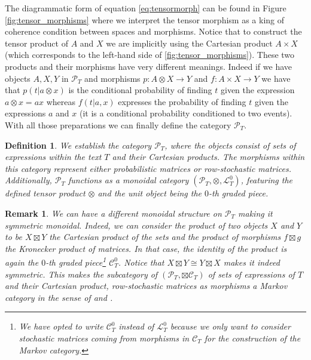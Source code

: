 \documentclass[10pt,a4paper]{elsarticle}
\newcommand{\C}{\mathcal{C}}
\renewcommand{\L}{\mathcal{L}}
\renewcommand{\P}{\mathcal{P}}
\newtheorem{definition}[theorem]{Definition}
\newtheorem{re}[theorem]{Remark}
\begin{document}
The diagrammatic form of equation \eqref{eq:tensormorph} can be found in Figure \ref{fig:tensor_morphisms} where we interpret the tensor morphism as a king of coherence condition between spaces and morphisms. Notice that to construct the tensor product of $A$ and $X$ we are implicitly using the Cartesian product $A\times X$ (which corresponds to the left-hand side of \ref{fig:tensor_morphisms}). These two products and their morphisms have very different meanings. Indeed if we have objects $A, X, Y$ in $\P_{T}$ and morphisms $p\colon A\otimes X\to Y$ and $f\colon A\times X \to Y$ we have that $p(t|a\otimes x)$ is the conditional probability of finding $t$ given the expression $a\otimes x =ax$ whereas $f(t|a, x)$ expresses the probability of finding $t$ given the expressions $a$ and $x$ (it is a conditional probability conditioned to two events). With all those preparations we can finally define the category $\P_{T}$.



\begin{definition}
	We establish the category $\mathcal{P}_{T}$, where the objects consist of sets of expressions within the text $T$ and their Cartesian products. The morphisms within this category represent either probabilistic matrices or row-stochastic matrices. Additionally, $\mathcal{P}_{T}$ functions as a monoidal category $(\mathcal{P}_{T}, \otimes, \mathcal{L}_{T}^{0})$, featuring the defined tensor product $\otimes$ and the unit object being the $0$-th graded piece.
\end{definition}

\begin{re}
	
	We can have a different monoidal structure on $\P_{T}$ making it symmetric monoidal. Indeed, we can  consider the product of two objects $X$ and $Y$ to be $ X\boxtimes Y$ the Cartesian product of the sets and the product of morphisms $f\boxtimes g$ the Kronecker product of matrices. In that case, the identity of the product is again the $0$-th graded piece\footnote{We have opted to write $\C_{T}^{0}$ instead of $\L_{T}^{0}$ because we only want to consider stochastic matrices coming from morphisms in $\C_{T}$ for the construction of the Markov category.} $\C_{T}^{0}$. Notice that $ X\boxtimes Y\cong Y\boxtimes X$ makes it indeed symmetric.
	This makes the subcategory of $(\P_{T},\boxtimes \C_{T})$ of sets of expressions of $T$ and their Cartesian product, row-stochastic matrices as morphisms a Markov category in the sense of \cite{fritz2023representable} and \cite{perrone2023markov}.
\end{re}
\end{document}
